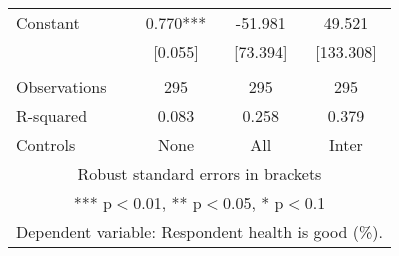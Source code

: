 \begin{tabular}{lccc}
Constant & 0.770*** & -51.981 & 49.521 \\
 & [0.055] & [73.394] & [133.308] \\
 &  &  &  \\
Observations & 295 & 295 & 295 \\
R-squared & 0.083 & 0.258 & 0.379 \\
 Controls & None & All & Inter \\ \hline
\multicolumn{4}{c}{ Robust standard errors in brackets} \\
\multicolumn{4}{c}{ *** p$<$0.01, ** p$<$0.05, * p$<$0.1} \\
\multicolumn{4}{c}{ Dependent variable: Respondent health is good (\%).} \\
\end{tabular}
